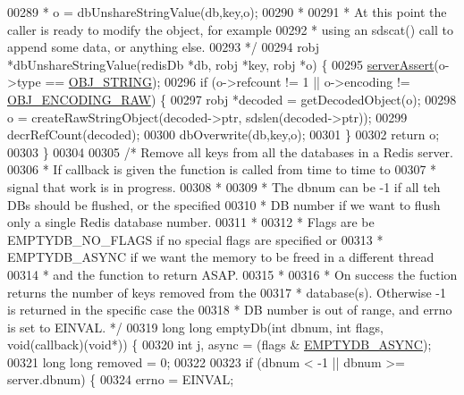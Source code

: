 \begin{DoxyCode}
00289 \textcolor{comment}{ * o = dbUnshareStringValue(db,key,o);}
00290 \textcolor{comment}{ *}
00291 \textcolor{comment}{ * At this point the caller is ready to modify the object, for example}
00292 \textcolor{comment}{ * using an sdscat() call to append some data, or anything else.}
00293 \textcolor{comment}{ */}
00294 robj *dbUnshareStringValue(redisDb *db, robj *key, robj *o) \{
00295     \hyperlink{server_8h_a88114b5169b4c382df6b56506285e56a}{serverAssert}(o->type == \hyperlink{server_8h_a65236ea160f69cdef33ec942092af88f}{OBJ\_STRING});
00296     \textcolor{keywordflow}{if} (o->refcount != 1 || o->encoding != \hyperlink{server_8h_a148bc85e3074e324a6dc5eebcad1bcd5}{OBJ\_ENCODING\_RAW}) \{
00297         robj *decoded = getDecodedObject(o);
00298         o = createRawStringObject(decoded->ptr, sdslen(decoded->ptr));
00299         decrRefCount(decoded);
00300         dbOverwrite(db,key,o);
00301     \}
00302     \textcolor{keywordflow}{return} o;
00303 \}
00304 
00305 \textcolor{comment}{/* Remove all keys from all the databases in a Redis server.}
00306 \textcolor{comment}{ * If callback is given the function is called from time to time to}
00307 \textcolor{comment}{ * signal that work is in progress.}
00308 \textcolor{comment}{ *}
00309 \textcolor{comment}{ * The dbnum can be -1 if all teh DBs should be flushed, or the specified}
00310 \textcolor{comment}{ * DB number if we want to flush only a single Redis database number.}
00311 \textcolor{comment}{ *}
00312 \textcolor{comment}{ * Flags are be EMPTYDB\_NO\_FLAGS if no special flags are specified or}
00313 \textcolor{comment}{ * EMPTYDB\_ASYNC if we want the memory to be freed in a different thread}
00314 \textcolor{comment}{ * and the function to return ASAP.}
00315 \textcolor{comment}{ *}
00316 \textcolor{comment}{ * On success the fuction returns the number of keys removed from the}
00317 \textcolor{comment}{ * database(s). Otherwise -1 is returned in the specific case the}
00318 \textcolor{comment}{ * DB number is out of range, and errno is set to EINVAL. */}
00319 \textcolor{keywordtype}{long} \textcolor{keywordtype}{long} emptyDb(\textcolor{keywordtype}{int} dbnum, \textcolor{keywordtype}{int} flags, \textcolor{keywordtype}{void}(callback)(\textcolor{keywordtype}{void}*)) \{
00320     \textcolor{keywordtype}{int} j, async = (flags & \hyperlink{server_8h_a83bdc5c1a2af487191bb7ca716494ee7}{EMPTYDB\_ASYNC});
00321     \textcolor{keywordtype}{long} \textcolor{keywordtype}{long} removed = 0;
00322 
00323     \textcolor{keywordflow}{if} (dbnum < -1 || dbnum >= server.dbnum) \{
00324         errno = EINVAL;

\end{DoxyCode}
